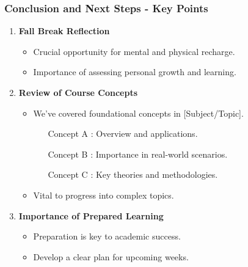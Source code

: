 \documentclass[aspectratio=169]{beamer}
\begin{document}
\begin{frame}[fragile]
  \frametitle{Conclusion and Next Steps - Key Points}
  \begin{enumerate}
    \item \textbf{Fall Break Reflection}
    \begin{itemize}
        \item Crucial opportunity for mental and physical recharge.
        \item Importance of assessing personal growth and learning.
    \end{itemize}
    
    \item \textbf{Review of Course Concepts}
    \begin{itemize}
        \item We've covered foundational concepts in [Subject/Topic].
        \begin{itemize}
            \item [Concept A]: Overview and applications.
            \item [Concept B]: Importance in real-world scenarios.
            \item [Concept C]: Key theories and methodologies.
        \end{itemize}
        \item Vital to progress into complex topics.
    \end{itemize}

    \item \textbf{Importance of Prepared Learning}
    \begin{itemize}
        \item Preparation is key to academic success.
        \item Develop a clear plan for upcoming weeks.
    \end{itemize}
  \end{enumerate}
\end{frame}
\end{document}
